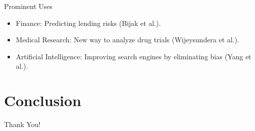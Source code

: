 \documentclass[article]{beamer}
\begin{document}
\begin{frame}{Prominent Uses}
\begin{center}
\begin{itemize}
    \item Finance: Predicting lending risks (Bijak et al.).
    \item Medical Research: New way to analyze drug trials (Wijeysundera et al.).
    \item Artificial Intelligence: Improving search engines by eliminating bias (Yang et al.).
\end{itemize}
\end{center}

\end{frame}

\section{Conclusion}


\begin{frame}{}
   \begin{center}
     \Huge{Thank You!}
   \end{center}
\end{frame}
\end{document}
